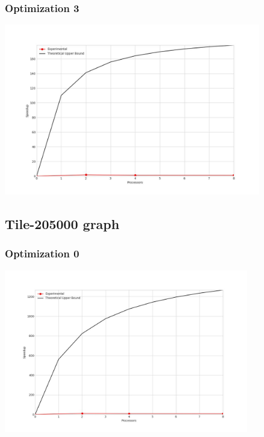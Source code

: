 \subsubsection{Optimization 3}
\begin{center}
    \resizebox{0.95\textwidth}{!}{}
    \includegraphics[width=0.84\textwidth]{../img/speedup-graph_type-tile-52000-O3}
\end{center}

\clearpage
\subsection{Tile-205000 graph}
\subsubsection{Optimization 0}
\begin{center}
    \resizebox{0.95\textwidth}{!}{}
    \includegraphics[width=0.8\textwidth]{../img/speedup-graph_type-tile-205000-O0}
\end{center}


